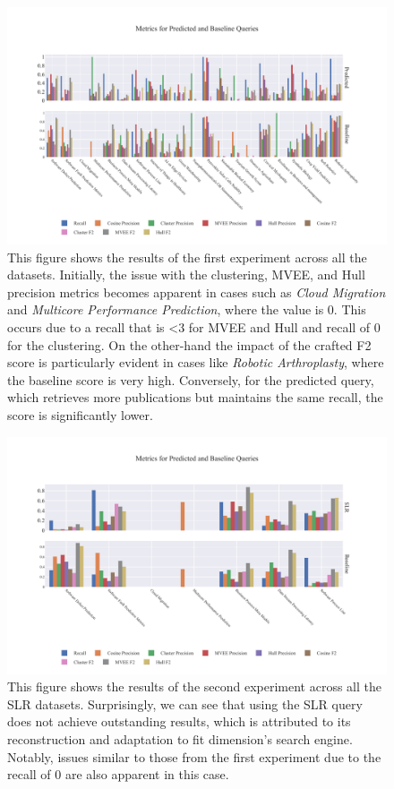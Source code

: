 \documentclass[%
  a4paper,fontsize=11pt,abstract=on,%
  oneside,BCOR=19mm,%
]{scrreprt}
\begin{document}
\begin{figure}
	\centering	
	\includegraphics[scale=0.7]{pics/all-metrics-1.pdf}
	\caption[Evaluation: Experiment 1]{This figure shows the results of the first experiment across all the datasets. Initially, the issue with the clustering, MVEE, and Hull precision metrics becomes apparent in cases such as \textit{Cloud Migration} and \textit{Multicore Performance Prediction}, where the value is 0. This occurs due to a recall that is <3 for MVEE and Hull and recall of 0 for the clustering. On the other-hand the impact of the crafted F2 score is particularly evident in cases like \textit{Robotic Arthroplasty}, where the baseline score is very high. Conversely, for the predicted query, which retrieves more publications but maintains the same recall, the score is significantly lower.}\label{fig:all-metrics-1}
\end{figure}

\begin{figure}
	\centering	
	\includegraphics[scale=0.7]{pics/all-metrics-2.pdf}
	\caption[Evaluation: Experiment 2]{This figure shows the results of the second experiment across all the SLR datasets. Surprisingly, we can see that using the SLR query does not achieve outstanding results, which is attributed to its reconstruction and adaptation to fit dimension's search engine. Notably, issues similar to those from the first experiment due to the recall of 0 are also apparent in this case.}\label{fig:all-metrics-2}
\end{figure}


\printbibliography


\end{document}

